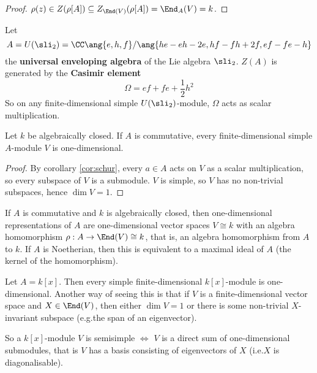 \begin{proof}
	$\rho(z) \in Z(\rho[A]) \subseteq Z_{\End(V)}(\rho[A]) = \End_A(V) = k$.
\end{proof}

\begin{exam}
	Let
	\[A = U(\sli_2) = \CC\ang{e,h,f}/\ang{he-eh-2e,hf-fh+2f,ef-fe-h}\]
	the \textbf{universal enveloping algebra} of the Lie algebra $\sli_2$.
	$Z(A)$ is generated by the \textbf{Casimir element}
	\[\Omega = ef+fe+\frac 12h^2\]
	So on any finite-dimensional simple $U(\sli_2)$-module, $\Omega$ acts as scalar multiplication.
\end{exam}

\begin{prop}
	Let $k$ be algebraically closed.
	If $A$ is commutative, every finite-dimensional simple $A$-module $V$ is one-dimensional.
\end{prop}

\begin{proof}
	By corollary \ref{cor:schur}, every $a \in A$ acts on $V$ as a scalar multiplication, so every subspace of $V$ is a submodule.
	$V$ is simple, so $V$ has no non-trivial subspaces, hence $\dim V = 1$.
\end{proof}

\begin{note}
	If $A$ is commutative and $k$ is algebraically closed, then one-dimensional representations of $A$ are one-dimensional vector spaces $V \cong k$ with an algebra homomorphism $\rho: A \to \End(V) \cong k$, that is, an algebra homomorphism from $A$ to $k$.
	If $A$ is Noetherian, then this is equivalent to a maximal ideal of $A$ (the kernel of the homomorphism).
\end{note}

\begin{exam}
	Let $A = k[x]$.
	Then every simple finite-dimensional $k[x]$-module is one-dimensional.
	Another way of seeing this is that if $V$ is a finite-dimensional vector space and $X \in \End(V)$, then either $\dim V=1$ or there is some non-trivial $X$-invariant subspace (e.g.\@ the span of an eigenvector).
	
	So a $k[x]$-module $V$ is semisimple $\iff$ $V$ is a direct sum of one-dimensional submodules, that is $V$ has a basis consisting of eigenvectors of $X$ (i.e.\@ $X$ is diagonalisable).
\end{exam}